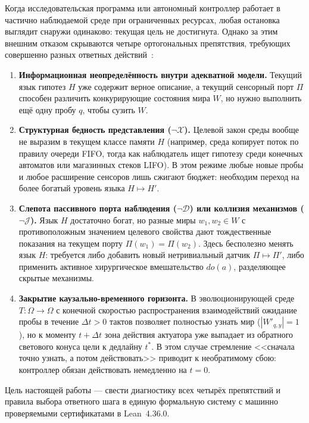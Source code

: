 \documentclass[11pt,a4paper]{article}
\theoremstyle{cleanthm}
\theoremstyle{cleandef}
\begin{document}
Когда исследовательская программа или автономный контроллер работает в частично наблюдаемой среде при ограниченных ресурсах, любая остановка выглядит снаружи одинаково: текущая цель не достигнута. Однако за этим внешним отказом скрываются четыре ортогональных препятствия, требующих совершенно разных ответных действий~\cite{reiter1987,pearl2009,wolpert2008}:
\begin{enumerate}
  \item \textbf{Информационная неопределённость внутри адекватной модели.} Текущий язык гипотез $H$ уже содержит верное описание, а текущий сенсорный порт $\Pi$ способен различить конкурирующие состояния мира $W$, но нужно выполнить ещё одну пробу $q$, чтобы сузить $W$.
  \item \textbf{Структурная бедность представления ($\neg\mathcal{X}$).} Целевой закон среды вообще не выразим в текущем классе памяти $H$ (например, среда копирует поток по правилу очереди FIFO, тогда как наблюдатель ищет гипотезу среди конечных автоматов или магазинных стеков LIFO). В этом режиме любые новые пробы и любое расширение сенсоров лишь сжигают бюджет: необходим переход на более богатый уровень языка $H\mapsto H'$.
  \item \textbf{Слепота пассивного порта наблюдения ($\neg\mathcal{D}$) или коллизия механизмов ($\neg\mathcal{J}$).} Язык $H$ достаточно богат, но разные миры $w_1,w_2\in W$ с противоположным значением целевого свойства дают тождественные показания на текущем порту $\Pi(w_1)=\Pi(w_2)$. Здесь бесполезно менять язык $H$: требуется либо добавить новый нетривиальный датчик $\Pi\mapsto\Pi'$, либо применить активное хирургическое вмешательство $do(a)$, разделяющее скрытые механизмы.
  \item \textbf{Закрытие каузально-временного горизонта.} В эволюционирующей среде $T:\Omega\to\Omega$ с конечной скоростью распространения взаимодействий ожидание пробы в течение $\Delta t>0$ тактов позволяет полностью узнать мир ($|W'_{q,y}|=1$), но к моменту $t+\Delta t$ зона действия актуатора уже выпадает из обратного светового конуса цели к дедлайну $t^*$. В этом случае стремление <<сначала точно узнать, а потом действовать>> приводит к необратимому сбою: контроллер обязан действовать немедленно на $t=0$.
\end{enumerate}

Цель настоящей работы --- свести диагностику всех четырёх препятствий и правила выбора ответного шага в единую формальную систему с машинно проверяемыми сертификатами в Lean~4.36.0.
\end{document}
